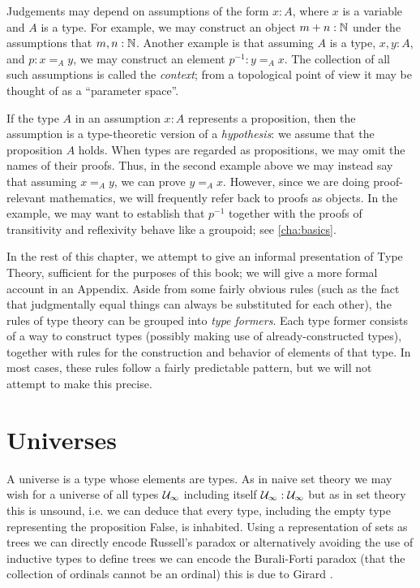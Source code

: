 Judgements may depend on assumptions of the form $x:A$, where $x$ is a variable and $A$ is a type.
For example, we may construct an object $m + n : \mathbb{N}$ under the assumptions that $m,n : \mathbb{N}$.
Another example is that assuming $A$ is a type, $x,y : A$, and $p : x =_A y$, we may construct an element $p^{-1} : y =_A x$.
The collection of all such assumptions is called the \emph{context}; from a topological point of view it may be thought of as a ``parameter space''.

If the type $A$ in an assumption $x:A$ represents a proposition, then the assumption is a type-theoretic version of a \emph{hypothesis}: we assume that the proposition $A$ holds.
When types are regarded as propositions, we may omit the names of their proofs.
Thus, in the second example above we may instead say that assuming $x =_A y$, we can prove $y =_A x$.
However, since we are doing proof-relevant mathematics, we will frequently refer back to proofs as objects.
In the example, we may want to establish that $p^{-1}$ together with the proofs of transitivity and reflexivity behave like a groupoid; see \autoref{cha:basics}.

In the rest of this chapter, we attempt to give an informal presentation of Type Theory, sufficient for the purposes of this book; we will give a more formal account in an Appendix.
Aside from some fairly obvious rules (such as the fact that judgmentally equal things can always be substituted for each other), the rules of type theory can be grouped into \emph{type formers}.
Each type former consists of a way to construct types (possibly making use of already-constructed types), together with rules for the construction and behavior of elements of that type.
In most cases, these rules follow a fairly predictable pattern, but we will not attempt to make this precise.


\section{Universes}
\label{sec:universes}

A universe is a type whose elements are types. As in naive set theory
we may wish for a universe of all types $\mathcal{U}_\infty$ including itself
$\mathcal{U}_\infty : \mathcal{U}_\infty$ but as in set
theory this is unsound, i.e. we can deduce that every type,
including the empty type representing the proposition False, is inhabited. Using a
representation of sets as trees we can directly encode Russell's
paradox \cite{thierry:trees} or alternatively avoiding the use of
inductive types to define trees we can encode the Burali-Forti paradox
(that the collection of ordinals cannot be an ordinal) this is due to
Girard \cite{girard:paradox}.

